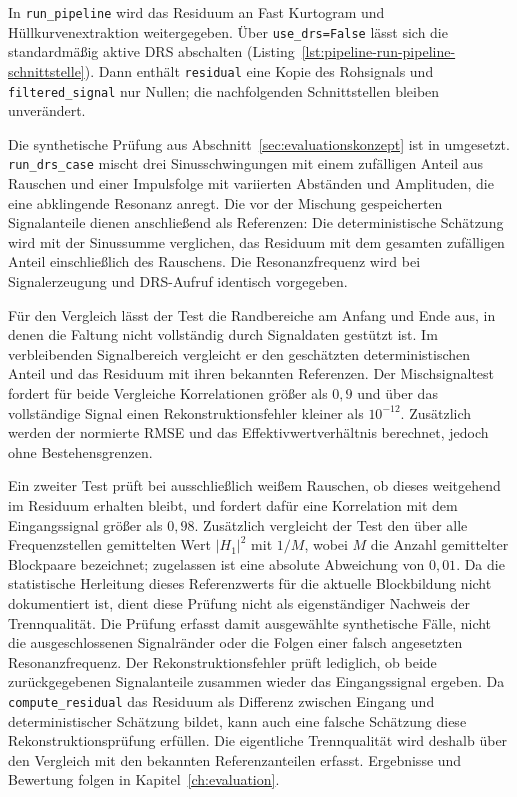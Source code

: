 In \texttt{run\_pipeline} wird das Residuum an Fast Kurtogram und
Hüllkurvenextraktion weitergegeben. Über \texttt{use\_drs=False}
lässt sich die standardmäßig aktive DRS abschalten
(Listing~\ref{lst:pipeline-run-pipeline-schnittstelle}).
Dann enthält \texttt{residual} eine Kopie des Rohsignals und
\texttt{filtered\_signal} nur Nullen; die nachfolgenden Schnittstellen
bleiben unverändert.

Die synthetische Prüfung aus Abschnitt~\ref{sec:evaluationskonzept}
ist in  umgesetzt.
\texttt{run\_drs\_case} mischt drei Sinusschwingungen mit einem zufälligen
Anteil aus Rauschen und einer Impulsfolge mit variierten Abständen und
Amplituden, die eine abklingende Resonanz anregt. Die vor der Mischung
gespeicherten Signalanteile dienen anschließend als Referenzen: Die
deterministische Schätzung wird
mit der Sinussumme verglichen, das Residuum mit dem gesamten zufälligen
Anteil einschließlich des Rauschens. Die Resonanzfrequenz wird bei
Signalerzeugung und DRS-Aufruf identisch vorgegeben.

\begingroup
{}
Für den Vergleich lässt der Test die Randbereiche am Anfang und Ende aus,
in denen die Faltung nicht vollständig durch Signaldaten gestützt ist.
Im verbleibenden Signalbereich vergleicht er den geschätzten
deterministischen Anteil und das Residuum mit ihren bekannten Referenzen.
Der Mischsignaltest fordert für beide Vergleiche Korrelationen größer als
$0{,}9$ und über das vollständige Signal einen Rekonstruktionsfehler kleiner
als $10^{-12}$. Zusätzlich werden der normierte \gls{RMSE} und das
Effektivwertverhältnis berechnet, jedoch ohne Bestehensgrenzen.
\par\endgroup

Ein zweiter Test prüft bei ausschließlich weißem Rauschen, ob dieses
weitgehend im Residuum erhalten bleibt, und fordert dafür eine Korrelation
mit dem Eingangssignal größer als $0{,}98$. Zusätzlich vergleicht der Test
den über alle Frequenzstellen gemittelten Wert $\lvert H_1\rvert^2$ mit
$1/M$, wobei $M$ die Anzahl gemittelter Blockpaare bezeichnet; zugelassen ist
eine absolute Abweichung von $0{,}01$. Da die statistische Herleitung dieses
Referenzwerts für die aktuelle Blockbildung nicht dokumentiert ist, dient
diese Prüfung nicht als eigenständiger Nachweis der Trennqualität.
Die Prüfung erfasst damit ausgewählte synthetische Fälle, nicht die
ausgeschlossenen Signalränder oder die Folgen einer falsch angesetzten
Resonanzfrequenz. Der Rekonstruktionsfehler prüft lediglich, ob beide
zurückgegebenen Signalanteile zusammen wieder das Eingangssignal ergeben.
Da \texttt{compute\_residual} das Residuum als Differenz zwischen Eingang
und deterministischer Schätzung bildet, kann auch eine falsche Schätzung
diese Rekonstruktionsprüfung erfüllen. Die eigentliche Trennqualität
wird deshalb über den Vergleich mit den bekannten Referenzanteilen erfasst.
Ergebnisse und Bewertung folgen in Kapitel~\ref{ch:evaluation}.

